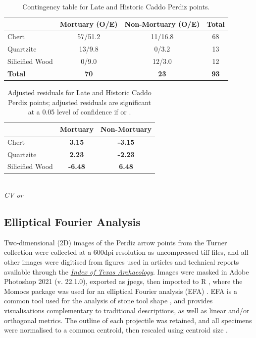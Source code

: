 \documentclass[review]{elsarticle}
\begin{document}
\begin{table}[tbh]\centering
\footnotesize
\caption{Contingency table for Late and Historic Caddo Perdiz points.}
\centering
\begin{tabular}{lccc}
\hline
 & Mortuary (O/E) & Non-Mortuary (O/E) & Total\\
\hline
Chert & 57/51.2 & 11/16.8 & 68\\
Quartzite & 13/9.8 & 0/3.2 & 13\\
Silicified Wood & 0/9.0 & 12/3.0 & 12\\
\hline
\textbf{Total} & \textbf{70} & \textbf{23} & \textbf{93}\\
\hline
\end{tabular}
\label{tab:Tbl3}
\end{table}

\begin{table}[tbh]\centering
\footnotesize
\caption{Adjusted residuals for Late and Historic Caddo Perdiz points; adjusted residuals are significant at a 0.05 level of confidence if \textbf{} or \textbf{}.}
\centering
\begin{tabular}{lcc}
\hline
 & Mortuary & Non-Mortuary\\
\hline
Chert & \textbf{3.15} & \textbf{-3.15}\\
Quartzite & \textbf{2.23} & \textbf{-2.23}\\
Silicified Wood & \textbf{-6.48} & \textbf{6.48}\\
\hline
\end{tabular}\\
\textit{CV  or }
\label{tab:Tbl4}
\end{table}

\subsection*{Elliptical Fourier Analysis}

Two-dimensional (2D) images of the Perdiz arrow points from the Turner collection were collected at a 600dpi resolution as uncompressed tiff files, and all other images were digitised from figures used in articles and technical reports available through the \href{https://scholarworks.sfasu.edu/ita/}{\textit{Index of Texas Archaeology}}. Images were masked in Adobe Photoshop 2021 (v. 22.1.0), exported as jpegs, then imported to R \citep{RN8584}, where the Momocs package was used for an elliptical Fourier analysis (EFA) \citep{RN8925}. EFA is a common tool used for the analysis of stone tool shape \citep{RN2805,RN9003,RN6313,RN5230,RN5225,RN5227,RN8358,RN8967,RN5231,RN7164,RN9004}, and provides visualisations complementary to traditional descriptions, as well as linear and/or orthogonal metrics. The outline of each projectile was retained, and all specimens were normalised to a common centroid, then rescaled using centroid size \citep{RN8923}. 
\end{document}
